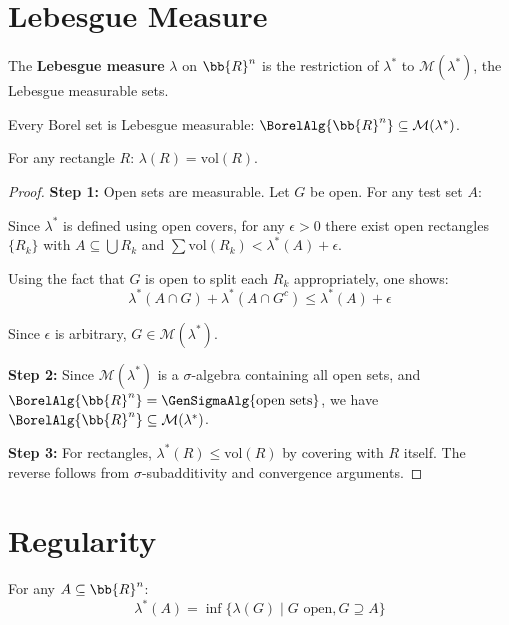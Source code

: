 \section{Lebesgue Measure}

\begin{definition}
The \textbf{Lebesgue measure} $\lambda$ on $\bb{R}^n$ is the restriction of $\lambda^*$ to $\mathcal{M}(\lambda^*)$, the Lebesgue measurable sets.
\end{definition}

\begin{theorem}
Every Borel set is Lebesgue measurable: $\BorelAlg{\bb{R}^n} \subseteq \mathcal{M}(\lambda^*)$.

For any rectangle $R$: $\lambda(R) = \text{vol}(R)$.
\end{theorem}

\begin{proof}
\textbf{Step 1:} Open sets are measurable. Let $G$ be open. For any test set $A$:

Since $\lambda^*$ is defined using open covers, for any $\epsilon > 0$ there exist open rectangles $\{R_k\}$ with $A \subseteq \bigcup R_k$ and $\sum \text{vol}(R_k) < \lambda^*(A) + \epsilon$.

Using the fact that $G$ is open to split each $R_k$ appropriately, one shows:
\[ \lambda^*(A \cap G) + \lambda^*(A \cap G^c) \leq \lambda^*(A) + \epsilon \]

Since $\epsilon$ is arbitrary, $G \in \mathcal{M}(\lambda^*)$.

\textbf{Step 2:} Since $\mathcal{M}(\lambda^*)$ is a $\sigma$-algebra containing all open sets, and $\BorelAlg{\bb{R}^n} = \GenSigmaAlg{\text{open sets}}$, we have $\BorelAlg{\bb{R}^n} \subseteq \mathcal{M}(\lambda^*)$.

\textbf{Step 3:} For rectangles, $\lambda^*(R) \leq \text{vol}(R)$ by covering with $R$ itself. The reverse follows from $\sigma$-subadditivity and convergence arguments.
\end{proof}

\section{Regularity}

\begin{theorem}
For any $A \subseteq \bb{R}^n$:
\[ \lambda^*(A) = \inf \{ \lambda(G) \mid G \text{ open}, G \supseteq A \} \]
\end{theorem}

